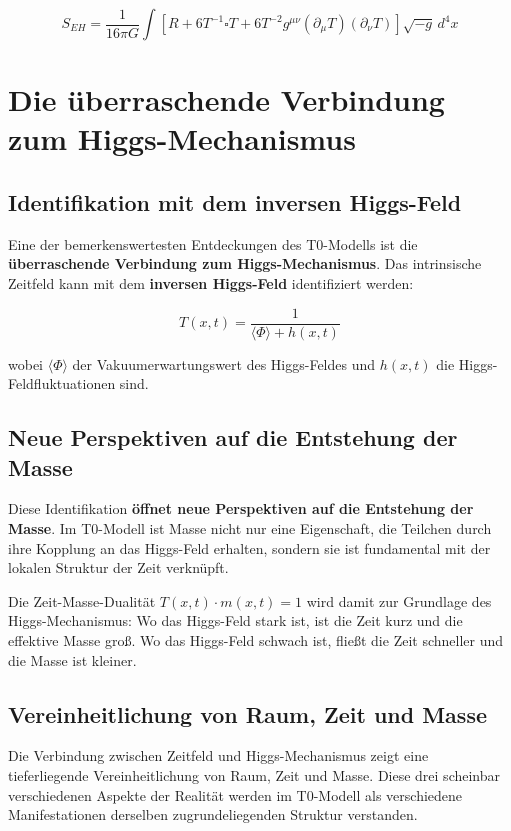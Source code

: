 \documentclass[12pt,a4paper]{report}
\begin{document}
	\begin{equation}
		S_{EH} = \frac{1}{16\pi G} \int [R + 6T^{-1}\square T + 6T^{-2}g^{\mu\nu}(\partial_\mu T)(\partial_\nu T)] \sqrt{-g} \, d^4x
	\end{equation}
	
	\section{Die überraschende Verbindung zum Higgs-Mechanismus}
	
	\subsection{Identifikation mit dem inversen Higgs-Feld}
	
	Eine der bemerkenswertesten Entdeckungen des T0-Modells ist die \textbf{überraschende Verbindung zum Higgs-Mechanismus}. Das intrinsische Zeitfeld kann mit dem \textbf{inversen Higgs-Feld} identifiziert werden:
	
	\begin{equation}
		T(x,t) = \frac{1}{\langle\Phi\rangle + h(x,t)}
	\end{equation}
	
	wobei $\langle\Phi\rangle$ der Vakuumerwartungswert des Higgs-Feldes und $h(x,t)$ die Higgs-Feldfluktuationen sind.
	
	\subsection{Neue Perspektiven auf die Entstehung der Masse}
	
	Diese Identifikation \textbf{öffnet neue Perspektiven auf die Entstehung der Masse}. Im T0-Modell ist Masse nicht nur eine Eigenschaft, die Teilchen durch ihre Kopplung an das Higgs-Feld erhalten, sondern sie ist fundamental mit der lokalen Struktur der Zeit verknüpft.
	
	Die Zeit-Masse-Dualität $T(x,t) \cdot m(x,t) = 1$ wird damit zur Grundlage des Higgs-Mechanismus: Wo das Higgs-Feld stark ist, ist die Zeit kurz und die effektive Masse groß. Wo das Higgs-Feld schwach ist, fließt die Zeit schneller und die Masse ist kleiner.
	
	\subsection{Vereinheitlichung von Raum, Zeit und Masse}
	
	Die Verbindung zwischen Zeitfeld und Higgs-Mechanismus zeigt eine tieferliegende Vereinheitlichung von Raum, Zeit und Masse. Diese drei scheinbar verschiedenen Aspekte der Realität werden im T0-Modell als verschiedene Manifestationen derselben zugrundeliegenden Struktur verstanden.
	
\end{document}
